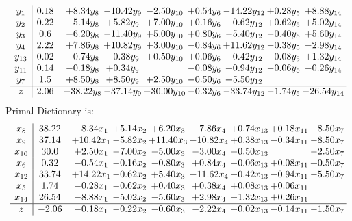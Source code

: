 \documentclass[8pt]{article}
\begin{document}
\[\begin{array}{c| c c@{\hskip 2pt} c@{\hskip 2pt} c@{\hskip 2pt} c@{\hskip 2pt} c@{\hskip 2pt} c@{\hskip 2pt} c@{\hskip 2pt} }
 y_{1}   &  0.18 & +  8.34 y_{8} & -10.42 y_{9} & -2.50 y_{10} & +  0.54 y_{6} & -14.22 y_{12} & +  0.28 y_{5} & +  8.88 y_{14}\\
 y_{2}   &  0.22 & -5.14 y_{8} & +  5.82 y_{9} & +  7.00 y_{10} & +  0.16 y_{6} & +  0.62 y_{12} & +  0.62 y_{5} & +  5.02 y_{14}\\
 y_{3}   &  0.6 & -6.20 y_{8} & -11.40 y_{9} & +  5.00 y_{10} & +  0.80 y_{6} & -5.40 y_{12} & -0.40 y_{5} & +  5.60 y_{14}\\
 y_{4}   &  2.22 & +  7.86 y_{8} & + 10.82 y_{9} & +  3.00 y_{10} & -0.84 y_{6} & + 11.62 y_{12} & -0.38 y_{5} & -2.98 y_{14}\\
 y_{13}   &  0.02 & -0.74 y_{8} & -0.38 y_{9} & +  0.50 y_{10} & +  0.06 y_{6} & +  0.42 y_{12} & -0.08 y_{5} & +  1.32 y_{14}\\
 y_{11}   &  0.14 & -0.18 y_{8} & +  0.34 y_{9} &   & -0.08 y_{6} & +  0.94 y_{12} & -0.06 y_{5} & -0.26 y_{14}\\
 y_{7}   &  1.5 & +  8.50 y_{8} & +  8.50 y_{9} & +  2.50 y_{10} & -0.50 y_{6} & +  5.50 y_{12} &    &   \\
\hline
z    &  2.06 & -38.22 y_{8} & -37.14 y_{9} & -30.00 y_{10} & -0.32 y_{6} & -33.74 y_{12} & -1.74 y_{5} & -26.54 y_{14}\\
\end{array}\]
Primal Dictionary is:
\[\begin{array}{c| c c@{\hskip 2pt} c@{\hskip 2pt} c@{\hskip 2pt} c@{\hskip 2pt} c@{\hskip 2pt} c@{\hskip 2pt} c@{\hskip 2pt} }
 x_{8}   &  38.22 & -8.34 x_{1} & +  5.14 x_{2} & +  6.20 x_{3} & -7.86 x_{4} & +  0.74 x_{13} & +  0.18 x_{11} & -8.50 x_{7}\\
 x_{9}   &  37.14 & + 10.42 x_{1} & -5.82 x_{2} & + 11.40 x_{3} & -10.82 x_{4} & +  0.38 x_{13} & -0.34 x_{11} & -8.50 x_{7}\\
 x_{10}   &  30.0 & +  2.50 x_{1} & -7.00 x_{2} & -5.00 x_{3} & -3.00 x_{4} & -0.50 x_{13} &   & -2.50 x_{7}\\
 x_{6}   &  0.32 & -0.54 x_{1} & -0.16 x_{2} & -0.80 x_{3} & +  0.84 x_{4} & -0.06 x_{13} & +  0.08 x_{11} & +  0.50 x_{7}\\
 x_{12}   &  33.74 & + 14.22 x_{1} & -0.62 x_{2} & +  5.40 x_{3} & -11.62 x_{4} & -0.42 x_{13} & -0.94 x_{11} & -5.50 x_{7}\\
 x_{5}   &  1.74 & -0.28 x_{1} & -0.62 x_{2} & +  0.40 x_{3} & +  0.38 x_{4} & +  0.08 x_{13} & +  0.06 x_{11} &   \\
 x_{14}   &  26.54 & -8.88 x_{1} & -5.02 x_{2} & -5.60 x_{3} & +  2.98 x_{4} & -1.32 x_{13} & +  0.26 x_{11} &   \\
\hline
z    &  -2.06 & -0.18 x_{1} & -0.22 x_{2} & -0.60 x_{3} & -2.22 x_{4} & -0.02 x_{13} & -0.14 x_{11} & -1.50 x_{7}\\
\end{array}\]
\end{document}
